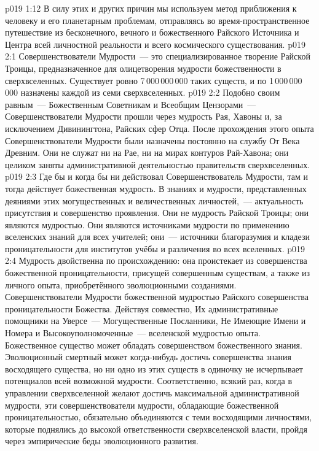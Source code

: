 \vs p019 1:12 \pc В силу этих и других причин мы используем метод приближения к человеку и его планетарным проблемам, отправляясь во время\hyp{}пространственное путешествие из бесконечного, вечного и божественного Райского Источника и Центра всей личностной реальности и всего космического существования.
\vs p019 2:1 Совершенствователи Мудрости~--- это специализированное творение Райской Троицы, предназначенное для олицетворения мудрости божественности в сверхвселенных. Существует ровно 7\,000\,000\,000 таких существ, и по 1\,000\,000\,000 назначены каждой из семи сверхвселенных.
\vs p019 2:2 Подобно своим равным~--- Божественным Советникам и Всеобщим Цензорами~--- Совершенствователи Мудрости прошли через мудрость Рая, Хавоны и, за исключением Дивинингтона, Райских сфер Отца. После прохождения этого опыта Совершенствователи Мудрости были назначены постоянно на службу От Века Древним. Они не служат ни на Рае, ни на мирах контуров Рай\hyp{}Хавона; они целиком заняты административной деятельностью правительств сверхвселенных.
\vs p019 2:3 \pc Где бы и когда бы ни действовал Совершенствователь Мудрости, там и тогда действует божественная мудрость. В знаниях и мудрости, представленных деяниями этих могущественных и величественных личностей,~--- актуальность присутствия и совершенство проявления. Они не  мудрость Райской Троицы; они являются  мудростью. Они являются источниками мудрости по применению вселенских знаний для всех учителей; они~--- источники благоразумия и кладези проницательности для институтов учёбы и различения во всех вселенных.
\vs p019 2:4 Мудрость двойственна по происхождению: она проистекает из совершенства божественной проницательности, присущей совершенным существам, а также из личного опыта, приобретённого эволюционными созданиями. Совершенствователи Мудрости  божественной мудростью Райского совершенства проницательности Божества. Действуя совместно, Их административные помощники на Уверсе~--- Могущественные Посланники, Не Имеющие Имени и Номера и Высокоуполномоченные~---  вселенской мудростью опыта. Божественное существо может обладать совершенством божественного знания. Эволюционный смертный может когда\hyp{}нибудь достичь совершенства знания восходящего существа, но ни одно из этих существ в одиночку не исчерпывает потенциалов всей возможной мудрости. Соответственно, всякий раз, когда в управлении сверхвселенной желают достичь максимальной административной мудрости, эти совершенствователи мудрости, обладающие божественной проницательностью, обязательно объединяются с теми восходящими личностями, которые поднялись до высокой ответственности сверхвселенской власти, пройдя через эмпирические беды эволюционного развития.

